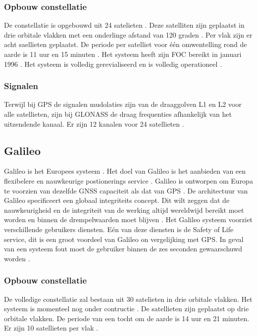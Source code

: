 \subsubsection{Opbouw constellatie} 
De constellatie is opgebouwd uit 24 satelieten \cite{LBibGNSS4}. Deze satelliten zijn geplaatst in drie orbitale vlakken met een onderlinge afstand van 120 graden \cite{LBibGLONASS2,LBibGNSS6}. Per vlak zijn er acht saellieten geplaatst. De periode per satelliet voor \'e\'en omwentelling rond de aarde is 11 uur en 15 minuten \cite{LBibGNSS6}.  Het systeem heeft zijn FOC bereikt in januari 1996 \cite{LBibGLONASS}. Het systeem is volledig gerevialiseerd en is volledig operationeel \cite{LBibGNSS4}.

\subsubsection{Signalen}
Terwijl bij GPS de signalen mudolaties zijn van de draaggolven L1 en L2 voor alle satellieten, zijn bij GLONASS de draag frequenties afhankelijk van het uitzendende kanaal. Er zijn 12 kanalen voor 24 satellieten \cite{LBibGPS3}.  
 
\subsection{Galileo}
\label{LGal}
Galileo is het Europees systeem \cite{LBibGNSS3}\cite{LBibGNSS4}. Het doel van Galileo is het aanbieden van een flexibelere en nauwkeurige postionerings service \cite{LBibGNSS4}. Galileo is ontworpen om Europa te voorzien van dezelfde GNSS capaciteit als dat van GPS \cite{LBibGNSS6}. De architectuur van Galileo specificeert een globaal integriteits concept. Dit wilt zeggen dat de nauwkeurigheid en de integriteit van de werking altijd wereldwijd bereikt moet worden en binnen de drempelwaarden moet blijven \cite{LBibGalileo}.  Het Galileo systeem voorziet verschillende gebruikers diensten. E\'en van deze diensten is de Safety of Life service, dit is een groot voordeel van Galileo  on vergelijking met GPS. In geval van een systeem fout moet de gebruiker binnen de zes seconden gewaarschuwd worden \cite{LBibGalileo}. 

\subsubsection{Opbouw constellatie}
De volledige constellatie zal bestaan  uit 30 satelieten in drie orbitale vlakken. Het systeem is momenteel nog onder contructie \cite{LBibGNSS4}. De satellieten zijn geplaatst op drie orbitale vlakken. De periode van een tocht om de aarde is 14 uur en 21 minuten. Er zijn 10 satellieten per vlak \cite{LBibGNSS6}. 
 
